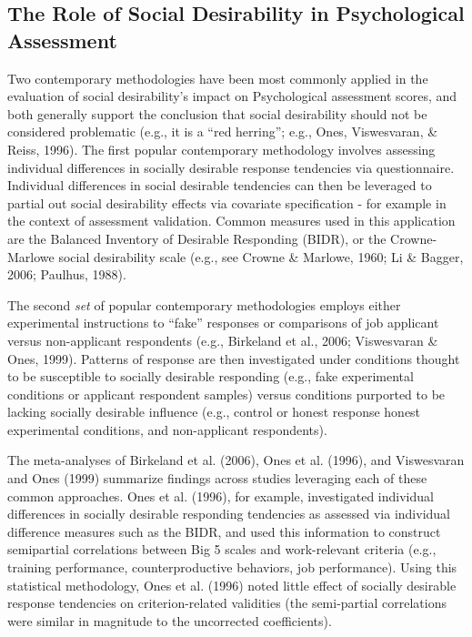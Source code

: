 \documentclass[
  english,
  ,jou]{apa6}
\begin{document}
\hypertarget{the-role-of-social-desirability-in-psychological-assessment}{%
\subsection{The Role of Social Desirability in Psychological Assessment}\label{the-role-of-social-desirability-in-psychological-assessment}}

Two contemporary methodologies have been most commonly applied in the evaluation of social desirability's impact on Psychological assessment scores, and both generally support the conclusion that social desirability should not be considered problematic (e.g., it is a ``red herring''; e.g., Ones, Viswesvaran, \& Reiss, 1996). The first popular contemporary methodology involves assessing individual differences in socially desirable response tendencies via questionnaire. Individual differences in social desirable tendencies can then be leveraged to partial out social desirability effects via covariate specification - for example in the context of assessment validation. Common measures used in this application are the Balanced Inventory of Desirable Responding (BIDR), or the Crowne-Marlowe social desirability scale (e.g., see Crowne \& Marlowe, 1960; Li \& Bagger, 2006; Paulhus, 1988).

The second \emph{set} of popular contemporary methodologies employs either experimental instructions to \enquote{fake} responses or comparisons of job applicant versus non-applicant respondents (e.g., Birkeland et al., 2006; Viswesvaran \& Ones, 1999). Patterns of response are then investigated under conditions thought to be susceptible to socially desirable responding (e.g., fake experimental conditions or applicant respondent samples) versus conditions purported to be lacking socially desirable influence (e.g., control or honest response honest experimental conditions, and non-applicant respondents).

The meta-analyses of Birkeland et al. (2006), Ones et al. (1996), and Viswesvaran and Ones (1999) summarize findings across studies leveraging each of these common approaches. Ones et al. (1996), for example, investigated individual differences in socially desirable responding tendencies as assessed via individual difference measures such as the BIDR, and used this information to construct semipartial correlations between Big 5 scales and work-relevant criteria (e.g., training performance, counterproductive behaviors, job performance). Using this statistical methodology, Ones et al. (1996) noted little effect of socially desirable response tendencies on criterion-related validities (the semi-partial correlations were similar in magnitude to the uncorrected coefficients).
\end{document}
